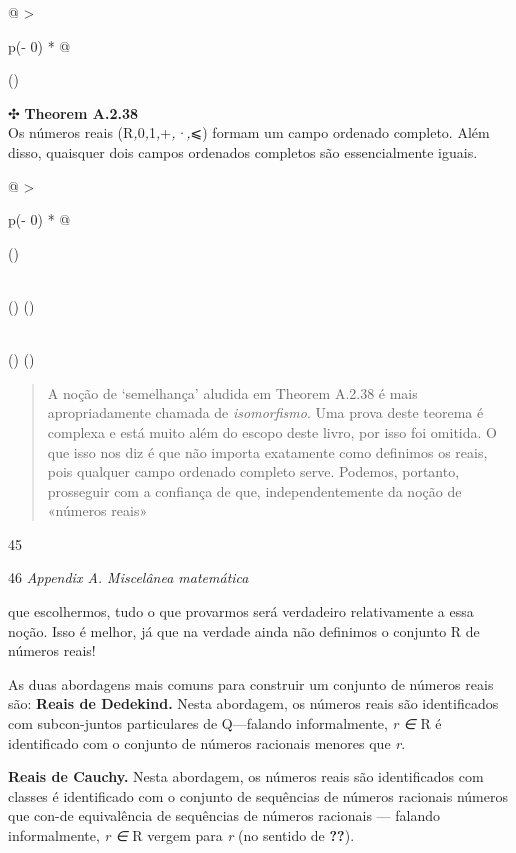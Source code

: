 \documentclass[
]{article}
\begin{document}
\begin{longtable}[]{@{}
  >{\raggedright\arraybackslash}p{(\columnwidth - 0\tabcolsep) * }@{}}
\toprule()
\begin{minipage}[b]{\linewidth}\raggedright
✣ \textbf{Theorem A.2.38}\\
Os números reais (R\emph{,}0\emph{,}1\emph{,}+\emph{,·,}⩽) formam um
campo ordenado completo. Além disso, quaisquer dois campos ordenados
completos são essencialmente iguais.

\begin{longtable}[]{@{}
  >{\raggedright\arraybackslash}p{(\columnwidth - 0\tabcolsep) * }@{}}
\toprule()
\begin{minipage}[b]{\linewidth}\raggedright
\end{minipage} \\
\midrule()
\endhead
\bottomrule()
\end{longtable}\strut
\end{minipage} \\
\midrule()
\endhead
\bottomrule()
\end{longtable}

\begin{quote}
A noção de `semelhança' aludida em Theorem A.2.38 é mais apropriadamente
chamada de \emph{isomorfismo}. Uma prova deste teorema é complexa e está
muito além do escopo deste livro, por isso foi omitida. O que isso nos
diz é que não importa exatamente como definimos os reais, pois qualquer
campo ordenado completo serve. Podemos, portanto, prosseguir com a
confiança de que, independentemente da noção de «números reais»
\end{quote}

45

46 \emph{Appendix A. Miscelânea matemática}

que escolhermos, tudo o que provarmos será verdadeiro relativamente a
essa noção. Isso é melhor, já que na verdade ainda não definimos o
conjunto R de números reais!

As duas abordagens mais comuns para construir um conjunto de números
reais são: \textbf{Reais de Dedekind.} Nesta abordagem, os números reais
são identificados com subcon-juntos particulares de Q---falando
informalmente, \emph{r ∈} R é identificado com o conjunto de números
racionais menores que \emph{r}.

\textbf{Reais de Cauchy.} Nesta abordagem, os números reais são
identificados com classes é identificado com o conjunto de sequências de
números racionais números que con-de equivalência de sequências de
números racionais --- falando informalmente, \emph{r ∈} R vergem para
\emph{r} (no sentido de \textbf{??}).
\end{document}
